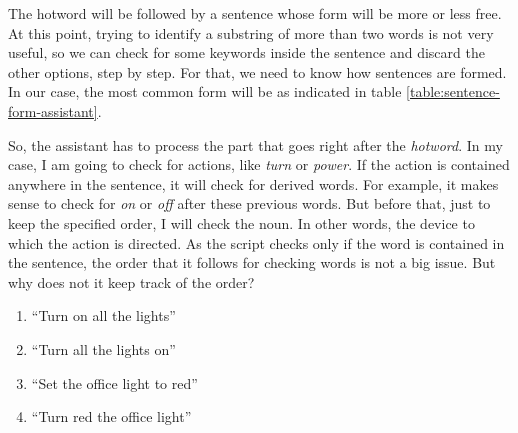 The hotword will be followed by a sentence whose form will be more or less free. At this point, trying to identify a substring of
more than two words is not very useful, so we can check for some keywords inside the sentence and discard the other options, step
by step. For that, we need to know how sentences are formed. In our case, the most common form will be as indicated in table
\ref{table:sentence-form-assistant}.

\begin{table}[]
	\centering
	\caption{Example sentence form for the assistant}
	\label{table:sentence-form-assistant}
\end{table}

So, the assistant has to process the part that goes right after the \textit{hotword}. In my case, I am going to check for actions,
like \textit{turn} or \textit{power}. If the action is contained anywhere in the sentence, it will check for derived words. For
example, it makes sense to check for \textit{on} or \textit{off} after these previous words. But before that, just to keep the
specified order, I will check the noun. In other words, the device to which the action is directed. As the script checks only if
the word is contained in the sentence, the order that it follows for checking words is not a big issue. But why does not it keep
track of the order?

\begin{enumerate}
	\item “Turn on all the lights”
	\item “Turn all the lights on”\\

	\item “Set the office light to red”
	\item “Turn red the office light”
\end{enumerate}

